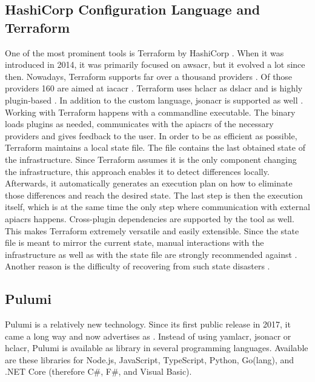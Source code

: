 \subsection{HashiCorp Configuration Language and Terraform}
One of the most prominent tools is Terraform by HashiCorp \cite{googletrends_iac}. When it was introduced in 2014, it was primarily focused on \gls{awsacr}, but it evolved a lot since then. Nowadays, Terraform supports far over a thousand providers \cite{terraform_providers}. Of those providers  160 are aimed at \gls{iacacr} \cite{terraform_providers_infrastructure}. Terraform uses \gls{hclacr} as \gls{dslacr} and is highly plugin-based \cite{terraform} \cite{terraform_docs_extend}. In addition to the custom language, \gls{jsonacr} is supported as well \cite{terraform_syntax}.
\newline
Working with Terraform happens with a commandline executable. The binary loads plugins as needed, communicates with the \gls{apiacr}s of the necessary providers and gives feedback to the user. In order to be as efficient as possible, Terraform maintains a local state file. The file contains the last obtained state of the infrastructure. Since Terraform assumes it is the only component changing the infrastructure, this approach enables it to detect differences locally. Afterwards, it automatically generates an execution plan on how to eliminate those differences and reach the desired state. The last step is then the execution itself, which is at the same time the only step where communication with external \gls{apiacr}s happens.
\newline
Cross-plugin dependencies are supported by the tool as well. This makes Terraform extremely versatile and easily extensible.
\newline
Since the state file is meant to mirror the current state, manual interactions with the infrastructure as well as with the state file are strongly recommended against \cite{terraform_cli_recover}. Another reason is the difficulty of recovering from such state disasters \cite{terraform_cli_recover}.

\subsection{Pulumi}
Pulumi is a relatively new technology. Since its first public release in 2017, it came a long way and now advertises as  \cite{github_pulumi_first_release} \cite{github_pulumi}. Instead of using \gls{yamlacr}, \gls{jsonacr} or \gls{hclacr}, Pulumi is available as library in several programming languages. Available are these libraries for Node.js, JavaScript, TypeScript, Python, Go(lang), and .NET Core (therefore C\#, F\#, and Visual Basic).

